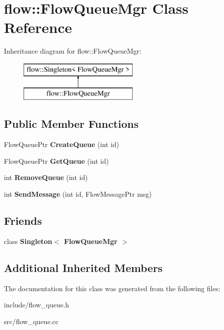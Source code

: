 \hypertarget{classflow_1_1_flow_queue_mgr}{}\section{flow\+:\+:Flow\+Queue\+Mgr Class Reference}
\label{classflow_1_1_flow_queue_mgr}
Inheritance diagram for flow\+:\+:Flow\+Queue\+Mgr\+:\begin{figure}[H]
\begin{center}
\leavevmode
\includegraphics[height=2.000000cm]{classflow_1_1_flow_queue_mgr}
\end{center}
\end{figure}
\subsection*{Public Member Functions}
\begin{DoxyCompactItemize}
\item 
Flow\+Queue\+Ptr {\bfseries Create\+Queue} (int id)\hypertarget{classflow_1_1_flow_queue_mgr_adc81af0146105c33c75e9fea61c79b43}{}\label{classflow_1_1_flow_queue_mgr_adc81af0146105c33c75e9fea61c79b43}

\item 
Flow\+Queue\+Ptr {\bfseries Get\+Queue} (int id)\hypertarget{classflow_1_1_flow_queue_mgr_ae82b66dd9f4e5c046d784fe3088674d5}{}\label{classflow_1_1_flow_queue_mgr_ae82b66dd9f4e5c046d784fe3088674d5}

\item 
int {\bfseries Remove\+Queue} (int id)\hypertarget{classflow_1_1_flow_queue_mgr_a1f1ec0732b555f2d039024de739812cc}{}\label{classflow_1_1_flow_queue_mgr_a1f1ec0732b555f2d039024de739812cc}

\item 
int {\bfseries Send\+Message} (int id, Flow\+Message\+Ptr msg)\hypertarget{classflow_1_1_flow_queue_mgr_a87ccd18294e184e831a3b4320aaf3864}{}\label{classflow_1_1_flow_queue_mgr_a87ccd18294e184e831a3b4320aaf3864}

\end{DoxyCompactItemize}
\subsection*{Friends}
\begin{DoxyCompactItemize}
\item 
class {\bfseries Singleton$<$ Flow\+Queue\+Mgr $>$}\hypertarget{classflow_1_1_flow_queue_mgr_a478fe4e1c8f6bd830cc9fb2ae4b98df2}{}\label{classflow_1_1_flow_queue_mgr_a478fe4e1c8f6bd830cc9fb2ae4b98df2}

\end{DoxyCompactItemize}
\subsection*{Additional Inherited Members}


The documentation for this class was generated from the following files\+:\begin{DoxyCompactItemize}
\item 
include/flow\+\_\+queue.\+h\item 
src/flow\+\_\+queue.\+cc\end{DoxyCompactItemize}

